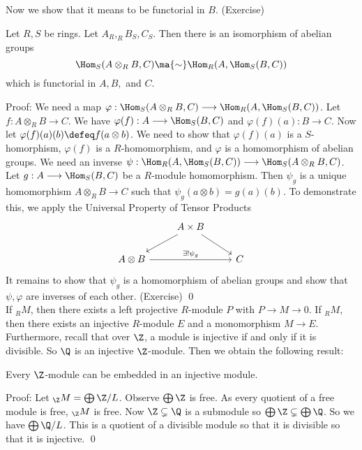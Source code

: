 Now we show that it means to be functorial in $B$. (Exercise) 

\begin{thm}
Let $R,S$ be rings. Let $A_R, _R B_S, C_S$. Then there is an isomorphism of abelian groups
\[
\Hom_S(A \otimes_R B, C) \ma{\sim} \Hom_R(A, \Hom_S(B,C))
\]
which is functorial in $A,B,$ and $C$.
\end{thm}

Proof: We need a map $\varphi: \Hom_S(A \otimes_R B,C) \longrightarrow \Hom_R(A,\Hom_S(B,C))$. Let $f: A \otimes_R B \longrightarrow C$. We have $\varphi(f): A \longrightarrow \Hom_S(B,C)$ and $\varphi(f)(a): B \longrightarrow C$. Now let $\varphi(f)(a)(b) \defeq f(a \otimes b)$. We need to show that $\varphi(f)(a)$ is a $S$-homorphism, $\varphi(f)$ is a $R$-homomorphism, and $\varphi$ is a homomorphism of abelian groups. We need an inverse $\psi: \Hom_R(A,\Hom_S(B,C)) \longrightarrow \Hom_S(A \otimes_R B,C)$. Let $g: A \longrightarrow \Hom_S(B,C)$ be a $R$-module homomorphism. Then $\psi_g$ is a unique homomorphism $A \otimes_R B \longrightarrow C$ such that $\psi_g(a \otimes b)=g(a)(b)$. To demonstrate this, we apply the Universal Property of Tensor Products
\[
\begin{tikzcd}
\; & A \times B \arrow{dl} \arrow{dr} & \\
A \otimes B \arrow{rr}{\exists! \psi_g} & & C 
\end{tikzcd}
\]
It remains to show that $\psi_g$ is a homomorphism of abelian groups and show that $\psi,\varphi$ are inverses of each other. (Exercise) \qed \\

If $_R M$, then there exists a left projective $R$-module $P$ with $P \longrightarrow M \longrightarrow 0$. If $_R M$, then there exists an injective $R$-module $E$ and a monomorphism $M \longrightarrow E$. Furthermore, recall that over $\Z$, a module is injective if and only if it is divisible. So $\Q$ is an injective $\Z$-module. Then we obtain the following result:

\begin{prop}
Every $\Z$-module can be embedded in an injective module. 
\end{prop}

Proof: Let $_\Z M=\bigoplus \Z/L$. Observe $\bigoplus \Z$ is free. As every quotient of a free module is free, $_\Z M$ is free. Now $\Z \subsetneq \Q$ is a submodule so $\bigoplus \Z \subsetneq \bigoplus \Q$. So we have $\bigoplus \Q/L$. This is a quotient of a divisible module so that it is divisible so that it is injective. \qed \\

